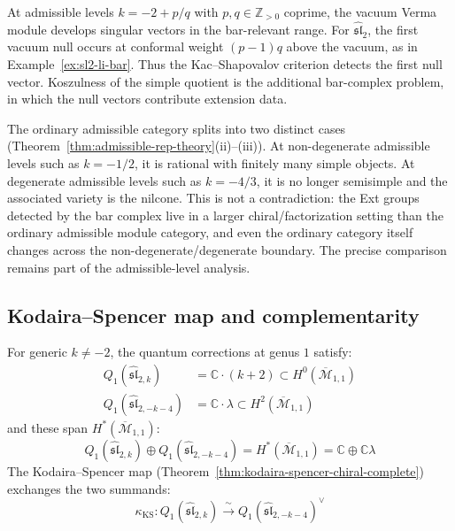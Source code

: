 \begin{remark}\label{rem:sl2-admissible}
At admissible levels $k = -2 + p/q$ with $p, q \in \mathbb{Z}_{>0}$
coprime, the vacuum Verma module develops singular vectors in the
bar-relevant range. For $\widehat{\mathfrak{sl}}_2$, the first
vacuum null occurs at conformal weight $(p-1)q$ above the vacuum,
as in Example~\ref{ex:sl2-li-bar}. Thus the Kac--Shapovalov
criterion detects the first null vector.  Koszulness of the simple
quotient is the additional bar-complex problem, in which the null
vectors contribute extension data.

The ordinary admissible category splits into two distinct cases
\textup{(}Theorem~\textup{\ref{thm:admissible-rep-theory}}(ii)--(iii)\textup{)}.
At non-degenerate admissible levels such as $k=-1/2$, it is
rational with finitely many simple objects. At degenerate
admissible levels such as $k=-4/3$, it is no longer semisimple and
the associated variety is the nilcone. This is not a contradiction:
the Ext groups detected by the bar complex live in a larger
chiral/factorization setting than the ordinary admissible module
category, and even the ordinary category itself changes across the
non-degenerate/degenerate boundary. The precise comparison remains
part of the admissible-level analysis.
\end{remark}

\subsection{Kodaira--Spencer map and complementarity}

\begin{theorem}
\label{thm:sl2-genus1-complementarity}
For generic $k \neq -2$, the quantum corrections at genus $1$ satisfy:
\begin{align}
Q_1(\widehat{\mathfrak{sl}}_{2,k}) &= \mathbb{C} \cdot (k+2) \subset H^0(\overline{\mathcal{M}}_{1,1}) \label{eq:Q1-sl2} \\
Q_1(\widehat{\mathfrak{sl}}_{2,-k-4}) &= \mathbb{C} \cdot \lambda \subset H^2(\overline{\mathcal{M}}_{1,1}) \label{eq:Q1-sl2-dual}
\end{align}
and these span $H^*(\overline{\mathcal{M}}_{1,1})$:
\begin{equation}\label{eq:sl2-complementarity}
Q_1(\widehat{\mathfrak{sl}}_{2,k}) \oplus Q_1(\widehat{\mathfrak{sl}}_{2,-k-4}) = H^*(\overline{\mathcal{M}}_{1,1}) = \mathbb{C} \oplus \mathbb{C}\lambda
\end{equation}
The Kodaira--Spencer map (Theorem~\ref{thm:kodaira-spencer-chiral-complete}) exchanges the two summands:
\begin{equation}
\kappa_{\mathrm{KS}}: Q_1(\widehat{\mathfrak{sl}}_{2,k}) \xrightarrow{\;\sim\;} Q_1(\widehat{\mathfrak{sl}}_{2,-k-4})^\vee
\end{equation}
\end{theorem}

